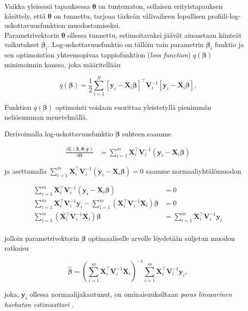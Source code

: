 \documentclass[finnish]{docopts}
\begin{document}
Vaikka yleisessä tapauksessa $\bm{\theta}$ on tuntematon, sellaisen erityistapauksen käsittely, että $\bm{\theta}$ on tunnettu, tarjoaa tärkeän välivaiheen lopullisen profiili-log-uskottavuusfunktion muodostamiseksi.\\

Parametrivektorin $\bm{\theta}$ ollessa tunnettu, estimoitavaksi jäävät ainoastaan kiinteät vaikutukset $\bm{\beta}_i$. Log-uskottavuusfunktio on tällöin vain parametrin $\bm{\beta}_i$ funktio ja sen optimointion yhteensopivaa tappiofunktion (\textit{loss function}) $q(\bm{\beta})$ minimoinnin kanssa, joka määritellään

$$
q(\bm{\beta}) = \frac{1}{2} \sum\limits_{i=1}^{N} [\bm{y}_i - \bm{X}_i \bm{\beta}]^\top \bm{V}_i^{-1} [\bm{y}_i - \bm{X}_i \bm{\beta}].
$$

Funktion $q(\bm{\beta})$ optimointi voidaan suorittaa yleistetyllä pienimmän neliösumman menetelmällä.

Derivoimalla log-uskottavuusfunktio $\bm{\beta}$ suhteen saamme

$$
\begin{aligned}
\frac{\partial L(\bm{\beta}, \bm{\theta};\bm{y})}{\partial \bm{\beta}} &= \sum\limits_{i=1}^{m}\bm{X}_{i}^\top \bm{V}_i^{-1} (\bm{y}_i - \bm{X}_{i} \bm{\beta})
\end{aligned}
$$

ja asettamalla $\sum\limits_{i=1}^{m}\bm{X}_{i}^\top \bm{V}_i^{-1} (\bm{y}_i - \bm{X}_{i} \bm{\beta}) = 0$ saamme normaaliyhtälömuodon

$$
\begin{aligned}
\sum\limits_{i=1}^{m}\bm{X}_{i}^\top \bm{V}_i^{-1} (\bm{y}_i - \bm{X}_{i} \bm{\beta}) &= 0 \\
\sum\limits_{i=1}^{m}\bm{X}_{i}^\top \bm{V}_i^{-1}\bm{y}_i - \sum\limits_{i=1}^{m}(\bm{X}_{i}^\top \bm{V}_i^{-1}\bm{X}_{i}) \bm{\beta} &= 0 \\
 \sum\limits_{i=1}^{m}(\bm{X}_{i}^\top \bm{V}_i^{-1}\bm{X}_{i}) \bm{\beta} &= \sum\limits_{i=1}^{m}\bm{X}_{i}^\top \bm{V}_i^{-1}\bm{y}_i \\
\end{aligned}
$$


jolloin parametrivektorin $\bm{\beta}$ optimaaliselle arvolle löydetään suljetun muodon ratkaisu

$$
\hat{\bm{\beta}} =  (\sum\limits_{i=1}^{m} \bm{X}_{i}^\top \bm{V}_i^{-1} \bm{X}_{i})^{-1} \sum\limits_{i=1}^{m} \bm{X}_{i}^\top \bm{V}_i^{-1} \bm{y}_i,
$$

joka, $\bm{y}_i$ ollessa normaalijakautunut, on ominaisuuksiltaan \textit{paras lineaarinen harhaton estimaattori} \cite{west14}.\\
\end{document}
